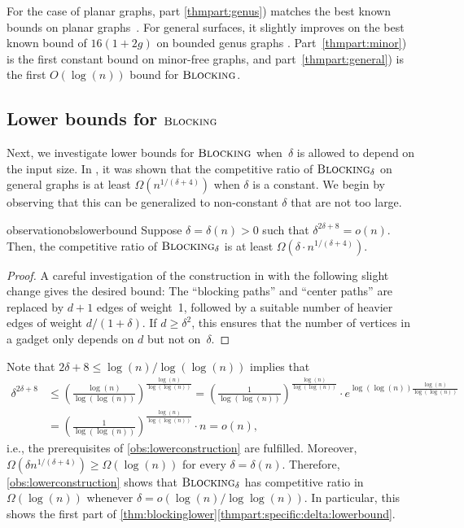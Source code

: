 \documentclass[a4paper,cleveref, autoref, thm-restate, thm-restate, UKenglish]{lipics-v2021}
\newcommand{\blocking}{\textsc{Blocking}}
\begin{document}
For the case of planar graphs, part \ref{thmpart:genus}) matches the best known bounds on planar \hbox{graphs~\cite{ pruhs94, megow}}. For general surfaces, it slightly improves on the best known bound of $16(1+2g)$ on bounded genus graphs \cite{megow}. Part~\ref{thmpart:minor}) is the first constant bound on minor-free graphs, and part~\ref{thmpart:general}) is the first $O(\log (n))$ bound for $\blocking$.



\subsection{Lower bounds for $\blocking$}\label{sec:lowerbounds}

Next, we investigate lower bounds for $\blocking$ when~$\delta$ is allowed to depend on the input size.
In \cite{megow}, it was shown that the competitive ratio of $\blocking_\delta$ on general graphs is at least $\Omega(n^{1/(\delta+4)})$ when $\delta$ is a constant. 
We begin by observing that this can be generalized to non-constant $\delta$ that are not too large.

\begin{restatable}{observation}{obslowerbound}\label{obs:lowerconstruction}
Suppose $\delta=\delta(n)>0$ such that $\delta^{2\delta+8}=o(n)$. Then, the competitive ratio of $\blocking_\delta$ is at least $\Omega(\delta \cdot n^{1/(\delta+4)})$. 
\end{restatable}

\begin{proof}
A careful investigation of the construction in \cite[Theorem 3]{megow} with the following slight change gives the desired bound: The ``blocking paths'' and ``center paths'' are replaced by $d+1$ edges of weight~1, followed by a suitable number of heavier edges of weight $d/(1+\delta)$. If $d\geq \delta^2$, this ensures that the number of vertices in a gadget only depends on $d$ but not on~$\delta$. 
\end{proof}

Note that $2\delta+8 \leq \log (n)/\log(\log(n))$ implies that
\begin{align*}
\delta^{2 \delta + 8} &\leq \left( \frac{\log (n)}{\log(\log(n))} \right)^{\frac{\log (n)}{\log(\log(n))}}
=  \left( \frac{1}{\log(\log(n))} \right)^{\frac{\log (n)}{\log(\log(n))}}\cdot e^{\log ( \log (n))\frac{\log (n)}{\log(\log(n))}}\\
&= \left( \frac{1}{\log(\log(n))} \right)^{\frac{\log (n)}{\log(\log(n))}} \cdot n
=o(n),
\end{align*}
i.e., the prerequisites of \cref{obs:lowerconstruction} are fulfilled. Moreover, $\Omega(\delta n^{1/(\delta+4)})\geq\Omega(\log (n))$ for every $\delta=\delta(n)$. Therefore, \cref{obs:lowerconstruction} shows that $\blocking_\delta$ has competitive ratio in $\Omega(\log (n))$  whenever $\delta = o(\log (n)/\log \log (n))$.  In particular, this shows the first part of \cref{thm:blockinglower}\ref{thmpart:specific:delta:lowerbound}.
\end{document}
